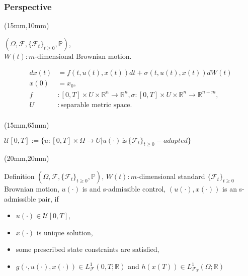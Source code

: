 \begin{frame}[plain]
	\frametitle{Perspective}
	\begin{textblock*}{100mm}(15mm,10mm)
		\begin{graybox}{}
			$(\Omega,\mathscr{F},\{\mathscr{F}_t\}_{t\geq 0},\mathbb{P})$,\\ $W(t):m\text{-dimensional Brownian motion}$.
			
			\begin{align*}
				dx(t)&=
				f(t,u(t),x(t))dt+\sigma(t,u(t),x(t))dW(t)\\
				x(0)&=
				x_0,\\
				f&:
				[0,T]\times U\times\mathbb{R}^n\rightarrow\mathbb{R}^n, \sigma:[0,T]\times U\times\mathbb{R}^n\rightarrow\mathbb{R}^{n+m},\\
				U&:
				\text{separable metric space}.\\
			\end{align*}
		\end{graybox}
	\end{textblock*}

	\begin{textblock*}{100mm}(15mm,65mm)
		\begin{yellowbox}{}
			$\mathcal{U}[0,T]:=\{u:[0,T]\times\Omega\rightarrow U | u(\cdot)\,\text{is}\,\{\mathscr{F}_t\}_{t\geq 0}-adapted\}$
		\end{yellowbox}
	\end{textblock*}
\end{frame}
\begin{frame}
	\begin{textblock*}{90mm}(20mm,20mm)
		\begin{graybox}{Definition}
			$(\Omega,\mathscr{F},\{\mathscr{F}_t\}_{t\geq 0},\mathbb{P})$, $W(t):$$m$-dimensional standard $\{\mathscr{F}_t\}_{t\geq 0}$ Brownian motion, $u(\cdot)$ is and s-admissible control, $(u(\cdot),x(\cdot))$ is an s-admissible pair, if
			\begin{itemize}
				\item $u(\cdot)\in\mathcal{U}[0,T]$,
				\item $x(\cdot)$ is unique solution,
				\item some prescribed state constraints are satisfied,
				\item $g(\cdot,u(\cdot),x(\cdot))\in L^1_{\mathscr{F}}(0,T;\mathbb{R})$ and $h(x(T))\in L^1_{\mathscr{F}_T}(\Omega;\mathbb{R})$
			\end{itemize}
		\end{graybox}
	\end{textblock*}
\end{frame}
